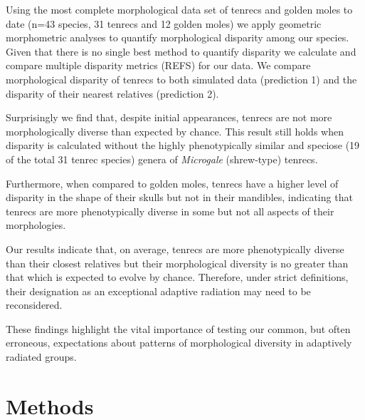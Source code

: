 \documentclass[12pt,a4paper]{article}
\begin{document}
Using the most complete morphological data set of tenrecs and golden moles to date (n=43 species, 31 tenrecs and 12 golden moles) we apply geometric morphometric analyses \citep{Rohlf1993, Zelditch2012} to quantify morphological disparity among our species. Given that there is no single best method to quantify disparity \citep{Ciampaglio2001} we calculate and compare multiple disparity metrics (REFS) for our data. We compare morphological disparity of tenrecs to both simulated data (prediction 1) and the disparity of their nearest relatives (prediction 2). %

Surprisingly %
we find that, despite initial appearances, tenrecs are not more morphologically diverse than expected by chance. This result still holds when disparity is calculated without the highly phenotypically similar and speciose (19 of the total 31 tenrec species) genera of \textit{Microgale} (shrew-type) tenrecs.

Furthermore, when compared to golden moles, tenrecs have a higher level of disparity in the shape of their skulls but not in their mandibles, indicating that tenrecs are more phenotypically diverse in some but not all aspects of their morphologies.%

Our results indicate that, on average, tenrecs are more phenotypically diverse than their closest relatives but their morphological diversity is no greater than that which is expected to evolve by chance. Therefore, under strict definitions, their designation as an exceptional adaptive radiation may need to be reconsidered. 

These findings highlight the vital importance of testing our common, but often erroneous, expectations about patterns of morphological diversity in adaptively radiated groups. 


\section{Methods}
\end{document}
